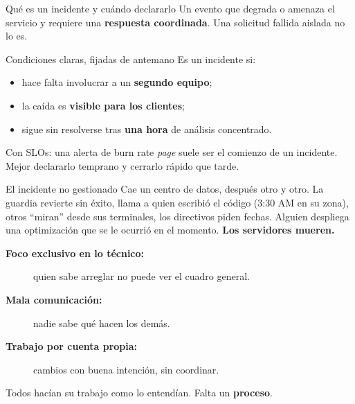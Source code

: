 \documentclass[institutional,screen,none]{ua-engineering-v6-beamer}
\begin{document}

\begin{frame}{Qué es un incidente y cuándo declararlo}
Un evento que degrada o amenaza el servicio y requiere una \textbf{respuesta coordinada}. Una solicitud fallida aislada no lo es.

\pause

\begin{block}{Condiciones claras, fijadas de antemano}
Es un incidente si:
\begin{itemize}
\item hace falta involucrar a un \textbf{segundo equipo};
\item la caída es \textbf{visible para los clientes};
\item sigue sin resolverse tras \textbf{una hora} de análisis concentrado.
\end{itemize}
\end{block}

\pause

{\small Con SLOs: una alerta de burn rate \emph{page} suele ser el comienzo de un incidente. Mejor declararlo temprano y cerrarlo rápido que tarde.}
\end{frame}

\begin{frame}{El incidente no gestionado}
Cae un centro de datos, después otro y otro. La guardia revierte sin éxito, llama a quien escribió el código (3:30 AM en su zona), otros ``miran'' desde sus terminales, los directivos piden fechas. Alguien despliega una optimización que se le ocurrió en el momento. \textbf{Los servidores mueren.}

\pause

\begin{description}
\item[\textbf{Foco exclusivo en lo técnico:}] quien sabe arreglar no puede ver el cuadro general.
\item[\textbf{Mala comunicación:}] nadie sabe qué hacen los demás.
\item[\textbf{Trabajo por cuenta propia:}] cambios con buena intención, sin coordinar.
\end{description}

\pause

{\small Todos hacían su trabajo como lo entendían. Falta un \textbf{proceso}.}
\end{frame}
\end{document}
